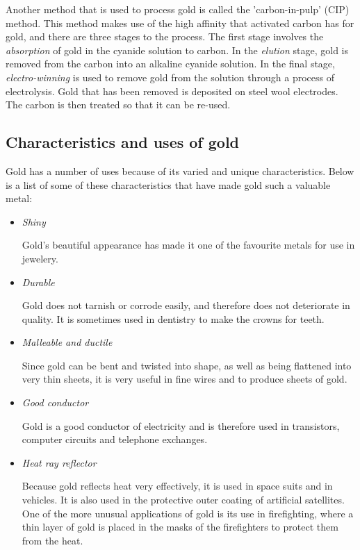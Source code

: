 \begin{IFact}{
Another method that is used to process gold is called the 'carbon-in-pulp' (CIP) method. This method makes use of the high affinity that activated carbon has for gold, and there are three stages to the process. The first stage involves the \emph{absorption} of gold in the cyanide solution to carbon. In the \emph{elution} stage, gold is removed from the carbon into an alkaline cyanide solution. In the final stage, \emph{electro-winning} is used to remove gold from the solution through a process of electrolysis. Gold that has been removed is deposited on steel wool electrodes. The carbon is then treated so that it can be re-used.}
\end{IFact}

\subsection{Characteristics and uses of gold}
Gold has a number of uses because of its varied and unique characteristics. Below is a list of some of these characteristics that have made gold such a valuable metal:
\begin{itemize}

\item \emph{Shiny}

Gold's beautiful appearance has made it one of the favourite metals for use in jewelery.

\item \emph{Durable}

Gold does not tarnish or corrode easily, and therefore does not deteriorate in quality. It is sometimes used in dentistry to make the crowns for teeth.

\item \emph{Malleable and ductile}

Since gold can be bent and twisted into shape, as well as being flattened into very thin sheets, it is very useful in fine wires and to produce sheets of gold.

\item \emph{Good conductor}

Gold is a good conductor of electricity and is therefore used in transistors, computer circuits and telephone exchanges.

\item \emph{Heat ray reflector}

Because gold reflects heat very effectively, it is used in space suits and in vehicles. It is also used in the protective outer coating of artificial satellites. One of the more unusual applications of gold is its use in firefighting, where a thin layer of gold is placed in the masks of the firefighters to protect them from the heat.

\end{itemize}

